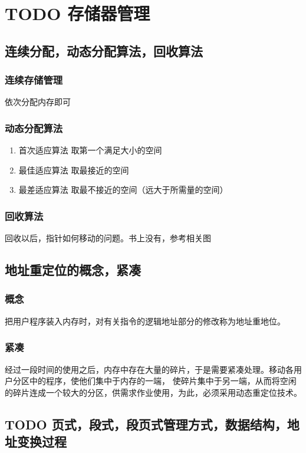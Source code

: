\documentclass[11pt]{article}
\begin{document}
\section{{\bfseries\sffamily TODO} 存储器管理}
\label{sec-3}
\subsection{连续分配，动态分配算法，回收算法}
\label{sec-3-1}
\subsubsection{连续存储管理}
\label{sec-3-1-1}
依次分配内存即可
\subsubsection{动态分配算法}
\label{sec-3-1-2}
\begin{enumerate}
\item 首次适应算法
\label{sec-3-1-2-1}
取第一个满足大小的空间
\item 最佳适应算法
\label{sec-3-1-2-2}
取最接近的空间
\item 最差适应算法
\label{sec-3-1-2-3}
取最不接近的空间（远大于所需量的空间）
\end{enumerate}
\subsubsection{回收算法}
\label{sec-3-1-3}
回收以后，指针如何移动的问题。书上没有，参考相关图

\subsection{地址重定位的概念，紧凑}
\label{sec-3-2}
\subsubsection{概念}
\label{sec-3-2-1}
把用户程序装入内存时，对有关指令的逻辑地址部分的修改称为地址重地位。
\subsubsection{紧凑}
\label{sec-3-2-2}
    经过一段时间的使用之后，内存中存在大量的碎片，于是需要紧凑处理。移动各用户分区中的程序，使他们集中于内存的一端，
使碎片集中于另一端，从而将空闲的碎片连成一个较大的分区，供需求作业使用，为此，必须采用动态重定位技术。
\subsection{{\bfseries\sffamily TODO} 页式，段式，段页式管理方式，数据结构，地址变换过程}
\label{sec-3-3}
\end{document}
